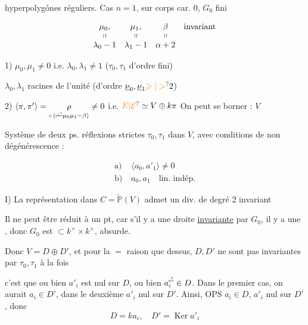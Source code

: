 hyperpolygônes réguliers.
Cas $n=1$, sur corps  car. 0, $G_{0}$ fini

\[
\begin{array}{cccl}
\mu_0,&\mu_1,&\beta&\text{invariant}\\[-2pt]
\shortparallel&\shortparallel&\shortparallel&\\
\lambda_0-1&\lambda_1-1&\alpha+2&
\end{array}
\]

1) $\mu_0,\mu_1\ne0$ i.e. $\lambda_0,\lambda_1\ne1$ \quad ($\tau_0,\tau_1$ d'ordre fini)

$\lambda_0,\lambda_1$ racines de l'unité (d'ordre $\underline{\nu}_0,\underline{\nu}_1\unsure{\geqslant|>}2$)

2) $\langle\pi,\pi'\rangle=\underset{\shortparallel\,\inserted{\deleted{\unsure{\beta}}\mu_0\mu_1-\beta}}{\rho}\ne0$ \quad i.e. $\unsure{E|\mathcal E}\simeq V\oplus k\pi$ \qquad On peut se borner : $V$

Système de deux ps. réflexions strictes $\tau_0,\tau_1$ dans $V$, avec conditions de non dégénérescence :

\[
\begin{aligned}
\text{a)}\;&\langle a_0,a'_1\rangle\ne0\\
\text{b)}\;&a_0,a_1\quad\text{lin. indép.}
\end{aligned}
\]

I) La représentation dans $C=\check{\mathbb P}(V)$ admet un div. de degré 2 invariant

Il ne peut être réduit à un pt, car s'il y a une droite  \uline{invariante} par $G_0$, il y a une , donc $G_0$ est  $\subset k^\times\times k^\times$, absurde.

Donc $V=D\oplus D'$, et pour la $=$ raison que dessus, $D,D'$ ne sont pas invariantes par $\tau_0,\tau_1$ à la fois

  c'est que ou bien $a'_i$ est nul sur $D$, ou bien $a^{\deleted{\unsure{\prime}}}_i\in D$. Dans le premier cas, on aurait $a_i\in D'$, dans le deuxième $a'_i$ nul sur $D'$. Ainsi, OPS $a_i\in D$, $a'_i$ nul sur $D'$, donc
\[
D=ka_i,\quad D'=\operatorname{Ker}a'_i
\]

